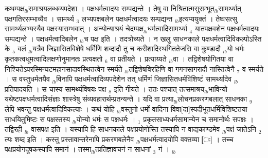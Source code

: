 \documentclass[article,12pt,a4paper]{memoir}%
\newcounter{parCount}
\begin{document}
कथम्पक्ष{\tiny $_{lb}$}समाश्रयलब्धव्यपदेशा । पक्षधर्मत्वादयः सम्पद्यन्ते । तेषु वा निश्रितात्मसुसम्भूत{\tiny $_{lb}$}सामर्थ्यात् पक्षगतिरसम्भाव्यैव । सामर्थ्य {\tiny $_{3}$} लभ्यपक्षबलेन पक्षधर्मत्वादयः सम्पद्यन्त {\tiny $_{lb}$}इत्यप्ययुक्तं । तेष्वसत्सु सामर्थ्यलभ्यस्यैव पक्षस्यासम्भवात् । अन्योन्याश्रयं चेदम्पक्ष{\tiny $_{lb}$}धर्मत्वादिसामर्थ्या {\tiny $_{4}$} यातपक्षवशेन पक्षधर्मत्वादयः सम्पद्यन्ते । पक्षधर्मत्वादिबलेन {\tiny $_{lb}$}च पक्ष इति । तदत्रोच्यते । न खलु साधनकाले पक्षधर्मत्वादिविकल्पोऽस्ति के {\tiny $_{5}$} वलं {\tiny $_{lb}$}यत्रैव जिज्ञासितविशेषे धर्मिणि शब्दादौ तु च करीशादिस्थगिततेजसि वा कुण्डादौ {\tiny $_{lb}$}यो धर्मः कृतकत्वधूमत्वादिलक्षणोनुमानतः प्रत्यक्षतो {\tiny $_{6}$} वा प्रतीयते । प्रत्याय्यते {\tiny $_{lb}$}वा । तद्विशेषयोगितया वा निश्चितेऽपरस्मिन्घटमहानसादावस्थितत्वेन स्मर्यते {\tiny $_{lb}$}तद्विशेषविरहिणि वा गगनसागरादौ नास्तित्वेनै {\tiny $_{7}$} व स्मर्यते । स वस्तुधर्मतयैव {\tiny $_{lb}$}विनापि पक्षधर्मत्वादिव्यपदेशेन तत् धर्मिणं जिज्ञासितधर्मविशिष्टं सामर्थ्यादेव {\tiny $_{lb}$}प्रतिपादयति । स चास्य सामर्थ्यविषयः पक्ष {\tiny $_{8}$} इति गीयते । ततः पश्चात् तत्समाश्रय{\tiny $_{lb}$}भाविन्यो यथेष्टपक्षधर्मत्वादिसंज्ञाः शास्त्रेषु संव्यवहारार्थम्प्रतन्यन्ते । यदि वा प्रत्या{\tiny $_{lb}$}लोचनप्रकरणबलात् साधनका {\tiny $_{9}$} \leavevmode{} लेपि भवन्तु पक्षधर्मत्वादिविकल्पाः । कथं योहि {\tiny $_{lb}$}वस्तुनो धर्मो वादिना विवा[दा]स्पदीभूतधर्मिविशिष्टतया साधयितुमिष्टः स पक्षस्तस्य {\tiny $_{lb}$}योन्यो धर्मः स पक्षधर्मः । {\tiny $_{1}$} प्रकृतसाध्यधर्मसामान्येन च समानोर्थः सपक्षः । तद्विरही {\tiny $_{lb}$} \leavevmode{} वासपक्ष इति । यस्यापि हि साधनकाले पक्षप्रयोगोस्ति तस्यापि न वाद्यकाण्डमेव {\tiny $_{lb}$}पक्षं जातेऽनि {\tiny $_{2}$} त्यः शब्द इति । कस्तु प्रस्तावान्तरेनापि प्रकरणबलेनैव {\tiny $_{lb}$}पक्षधर्मत्वादयोपि वक्तव्या [ः] । तच्च पक्षप्रयोगदूषकस्यापि समानं । तस्मा{\tiny $_{lb}$}त्प्रतिज्ञावचनं न साधनां {\tiny $_{3}$} गं ।
	{}
	\pend%
      {\tiny $_{lb}$}
\end{document}

